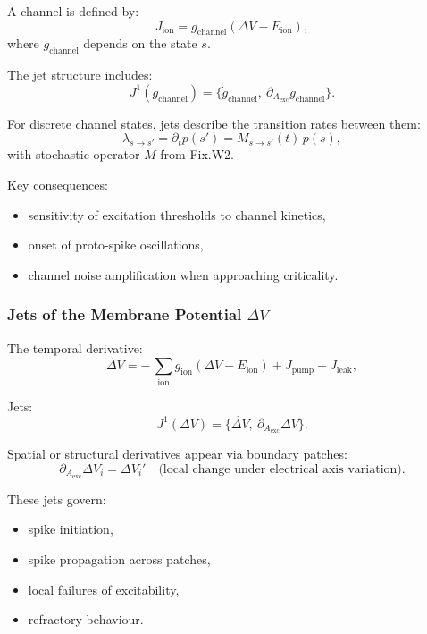 A channel is defined by:
\[
J_{\mathrm{ion}} = g_{\mathrm{channel}}(\Delta V - E_{\mathrm{ion}}),
\]
where $g_{\mathrm{channel}}$ depends on the state $s$.

The jet structure includes:
\[
J^1(g_{\mathrm{channel}})=
\{\dot{g}_{\mathrm{channel}},
\ \partial_{A_{\mathrm{exc}}}g_{\mathrm{channel}}\}.
\]

For discrete channel states, jets describe the transition rates between
them:
\[
\lambda_{s\to s'} = \partial_t p(s') = M_{s\to s'}(t)\,p(s),
\]
with stochastic operator $M$ from Fix.W2.

Key consequences:

\begin{itemize}
    \item sensitivity of excitation thresholds to channel kinetics,
    \item onset of proto-spike oscillations,
    \item channel noise amplification when approaching criticality.
\end{itemize}


\subsubsection{Jets of the Membrane Potential \texorpdfstring{$\Delta V$}{\Delta V}}

The temporal derivative:
\[
\dot{\Delta V}
=
-\,\sum_{\mathrm{ion}} g_{\mathrm{ion}}(\Delta V - E_{\mathrm{ion}})
+ J_{\mathrm{pump}}
+ J_{\mathrm{leak}},
\]

Jets:
\[
J^1(\Delta V)=
\{\dot{\Delta V}, \ \partial_{A_{\mathrm{exc}}}\Delta V\}.
\]

Spatial or structural derivatives appear via boundary patches:
\[
\partial_{A_{\mathrm{exc}}}\Delta V_i
=
\Delta V_i' \quad\text{(local change under electrical axis variation)}.
\]

These jets govern:

\begin{itemize}
    \item spike initiation,
    \item spike propagation across patches,
    \item local failures of excitability,
    \item refractory behaviour.
\end{itemize}


